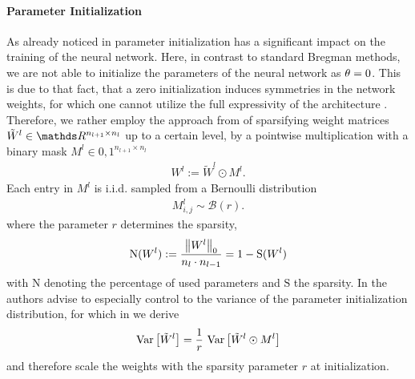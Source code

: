 \paragraph{Parameter Initialization} As already noticed in \cite{bengio10} parameter initialization has a significant impact on the training of the neural network. Here, in contrast to standard Bregman methods, we are not able to initialize the parameters of the neural network as $\theta=0$. This is due to that fact, that a zero initialization induces symmetries in the network weights, for which one cannot utilize the full expressivity of the architecture \cite[Ch. 6]{Goodfellow16}. Therefore, we rather employ the approach from \cite{liu2021,dettmers2019sparse,martens2010deep} of sparsifying weight matrices $\tilde W^l\in\R^{n_{l+1}\times n_l}$ up to a certain level, by a pointwise multiplication with a binary mask $M^l\in{0,1}^{n_{l+1}\times n_l}$
%
\begin{align*}
W^l := \tilde W^{l} \odot M^l.
\end{align*}
%
%
Each entry in $M^l$ is i.i.d. sampled from a Bernoulli distribution
%
\begin{align*}
M^l_{i,j}\sim \mathcal{B}(r).
\end{align*}
%
where the parameter $r$ determines the sparsity,
%
\begin{align*}
\mathrm{N}(W^l):=\frac{\left\|W^l\right\|_0}{n_l \cdot n_{l-1}}=
1 - \mathrm{S}(W^l)
\end{align*}
%
with $\mathrm{N}$ denoting the percentage of used parameters and $\mathrm{S}$ the sparsity.
%
%
In \cite{bengio10} the authors advise to especially control to the variance of the parameter initialization distribution, for which in \cite{bungert2022bregman} we derive
%
\begin{align}\label{eq:initcond2}
\mathrm{Var}\left[\tilde W^l\right] = \frac{1}{r}~\mathrm{Var}\left[\tilde W^l \odot M^l\right]
\end{align}
%
and therefore scale the weights with the sparsity parameter $r$ at initialization.
%
%
